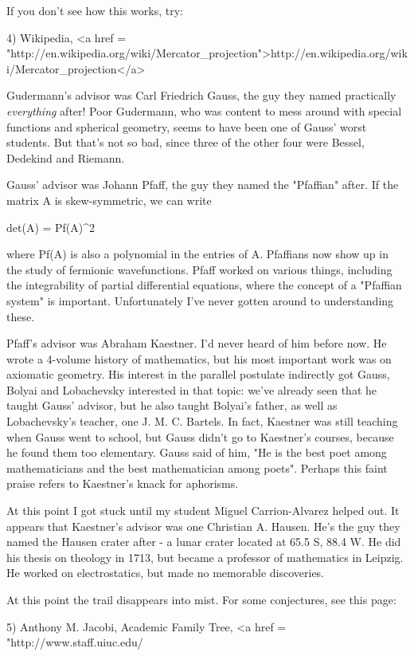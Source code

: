 If you don't see how this works, try:

4) Wikipedia, <a href = "http://en.wikipedia.org/wiki/Mercator_projection">http://en.wikipedia.org/wiki/Mercator_projection</a>

Gudermann's advisor was Carl Friedrich Gauss, the guy they named
practically \emph{everything} after!  Poor Gudermann, who was content to mess
around with special functions and spherical geometry, seems to have been
one of Gauss' worst students.  But that's not so bad, since three of the
other four were Bessel, Dedekind and Riemann.   

Gauss' advisor was Johann Pfaff, the guy they named the "Pfaffian"
after.  If the matrix A is skew-symmetric, we can write

det(A) = Pf(A)^{2}

where Pf(A) is also a polynomial in the entries of A.  Pfaffians now
show up in the study of fermionic wavefunctions.  Pfaff worked on
various things, including the integrability of partial differential
equations, where the concept of a "Pfaffian system" is important.
Unfortunately I've never gotten around to understanding these.

Pfaff's advisor was Abraham Kaestner.  I'd never heard of him before
now.  He wrote a 4-volume history of mathematics, but his most important
work was on axiomatic geometry.  His interest in the parallel postulate
indirectly got Gauss, Bolyai and Lobachevsky interested in that topic:
we've already seen that he taught Gauss' advisor, but he also taught
Bolyai's father, as well as Lobachevsky's teacher, one J. M. C. Bartels.
In fact, Kaestner was still teaching when Gauss went to school, but
Gauss didn't go to Kaestner's courses, because he found them too
elementary.  Gauss said of him, "He is the best poet among
mathematicians and the best mathematician among poets".  Perhaps 
this faint praise refers to Kaestner's knack for aphorisms.    


At this point I got stuck until my student Miguel Carrion-Alvarez
helped out.  It appears that Kaestner's advisor was one Christian
A. Hausen.  He's the guy they named the Hausen crater after - a lunar
crater located at 65.5 S, 88.4 W.  He did his thesis on theology in
1713, but became a professor of mathematics in Leipzig.  He worked on
electrostatics, but made no memorable discoveries.


 At this point the trail disappears into mist.  For some
conjectures, see this page:

5) Anthony M. Jacobi, Academic Family Tree,
<a href = "http://www.staff.uiuc.edu/%


